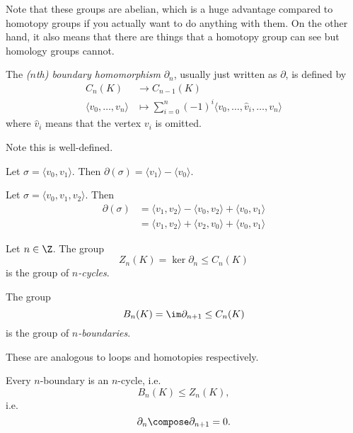 \documentclass[a4paper]{article}
\renewcommand{\b}{\partial} %
\begin{document}
\begin{remark}
  Note that these groups are abelian, which is a huge advantage compared to homotopy groups if you actually want to do anything with them. On the other hand, it also means that there are things that a homotopy group can see but homology groups cannot.
\end{remark}

\begin{definition}
  The \emph{(\(n\)th) boundary homomorphism} \(\b_n\), usually just written as \(\b\), is defined by
  \begin{align*}
    C_n(K) &\to C_{n - 1}(K) \\
    \langle v_0, \dots, v_n \rangle &\mapsto \sum_{i = 0}^n (-1)^i \langle v_0, \dots, \hat v_i, \dots, v_n \rangle
  \end{align*}
  where \(\hat v_i\) means that the vertex \(v_i\) is omitted.
\end{definition}

Note this is well-defined.

\begin{eg}
  Let \(\sigma = \langle v_0, v_1 \rangle\). Then \(\b(\sigma) = \langle v_1 \rangle - \langle v_0 \rangle\).
\end{eg}

\begin{eg}
  Let \(\sigma = \langle v_0, v_1, v_2 \rangle\). Then
  \begin{align*}
    \b(\sigma)
    &= \langle v_1, v_2 \rangle - \langle v_0, v_2 \rangle + \langle v_0, v_1 \rangle \\
    &= \langle v_1, v_2 \rangle + \langle v_2, v_0 \rangle + \langle v_0, v_1 \rangle
  \end{align*}
\end{eg}

\begin{definition}
  Let \(n \in \Z\). The group
  \[
    Z_n(K) = \ker \b_n \leq C_n(K)
  \]
  is the group of \emph{\(n\)-cycles}.
  
  The group
  \[
    B_n(K) = \im \b_{n + 1} \leq C_n(K)
  \]
  is the group of \emph{\(n\)-boundaries}.
\end{definition}

These are analogous to loops and homotopies respectively.

\begin{lemma}
  Every \(n\)-boundary is an \(n\)-cycle, i.e.
  \[
    B_n(K) \leq Z_n(K),
  \]
  i.e.
  \[
    \b_n \compose \b_{n + 1} = 0.
  \]
\end{lemma}
\end{document}
